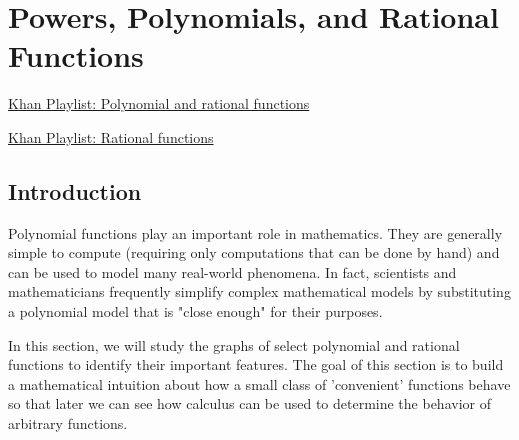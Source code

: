 \section{Powers, Polynomials, and Rational Functions} \label{S.0.6.PowersPolysRationals}


\vspace*{-14 pt}


\begin{web}
\item \href{https://www.khanacademy.org/math/algebra2/polynomial_and_rational}{Khan
    Playlist: Polynomial and rational functions}
\item
    \href{https://www.khanacademy.org/math/algebra2/polynomial_and_rational/rational_funcs_tutorial/v/adding-and-subtracting-rational-expressions}{Khan
    Playlist: Rational functions}
\end{web}

\nin \hrulefill


\subsection*{Introduction}

Polynomial functions play an important role in mathematics.  They are generally simple to compute (requiring only computations that can be done by hand) and can be used to model many real-world phenomena.  In fact, scientists and mathematicians frequently simplify complex mathematical models by substituting a polynomial model that is "close enough" for their purposes.

In this section, we will study the graphs of select polynomial and rational functions to identify their important features.  The goal of this section is to build a mathematical intuition about how a small class of 'convenient' functions behave so that later we can see how calculus can be used to determine the behavior of arbitrary functions.

